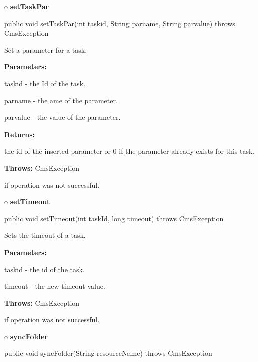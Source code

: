 o {\bf setTaskPar} 

\begin{PRE}
 public void setTaskPar(int taskid,
                        String parname,
                        String parvalue) throws CmsException
\end{PRE}

\begin{description}
\htmlDD Set a parameter for a task. 

\begin{description}
\item {\bf Parameters:}  

taskid - the Id of the task.  

parname - the ame of the parameter.  

parvalue - the value of the parameter.  
\item {\bf Returns:}  

the id of the inserted parameter or 0 if the parameter already exists for this
task.  
\item {\bf Throws:} CmsException  

if operation was not successful.  
\end{description}

\end{description}

o {\bf setTimeout} 

\begin{PRE}
 public void setTimeout(int taskId,
                        long timeout) throws CmsException
\end{PRE}

\begin{description}
\htmlDD Sets the timeout of a task. 

\begin{description}
\item {\bf Parameters:}  

taskid - the id of the task.  

timeout - the new timeout value.  
\item {\bf Throws:} CmsException  

if operation was not successful.  
\end{description}

\end{description}

o {\bf syncFolder} 

\begin{PRE}
 public void syncFolder(String resourceName) throws CmsException
\end{PRE}

